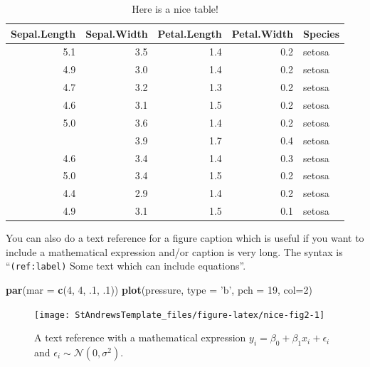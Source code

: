 \documentclass[
]{book}
\newenvironment{Shaded}{\begin{snugshade}}{\end{snugshade}}
\newcommand{\DataTypeTok}[1]{\textcolor[rgb]{0.13,0.29,0.53}{#1}}
\newcommand{\DecValTok}[1]{\textcolor[rgb]{0.00,0.00,0.81}{#1}}
\newcommand{\FloatTok}[1]{\textcolor[rgb]{0.00,0.00,0.81}{#1}}
\newcommand{\KeywordTok}[1]{\textcolor[rgb]{0.13,0.29,0.53}{\textbf{#1}}}
\newcommand{\NormalTok}[1]{#1}
\newcommand{\StringTok}[1]{\textcolor[rgb]{0.31,0.60,0.02}{#1}}
\theoremstyle{definition}
\theoremstyle{definition}
\theoremstyle{definition}
\theoremstyle{remark}
\begin{document}
\begin{table}

\caption{\label{tab:nice-tab}Here is a nice table!}
\centering
\begin{tabular}[t]{rrrrl}
\toprule
Sepal.Length & Sepal.Width & Petal.Length & Petal.Width & Species\\
\midrule
5.1 & 3.5 & 1.4 & 0.2 & setosa\\
4.9 & 3.0 & 1.4 & 0.2 & setosa\\
4.7 & 3.2 & 1.3 & 0.2 & setosa\\
4.6 & 3.1 & 1.5 & 0.2 & setosa\\
5.0 & 3.6 & 1.4 & 0.2 & setosa\\
\addlinespace
5.4 & 3.9 & 1.7 & 0.4 & setosa\\
4.6 & 3.4 & 1.4 & 0.3 & setosa\\
5.0 & 3.4 & 1.5 & 0.2 & setosa\\
4.4 & 2.9 & 1.4 & 0.2 & setosa\\
4.9 & 3.1 & 1.5 & 0.1 & setosa\\
\bottomrule
\end{tabular}
\end{table}

You can also do a text reference for a figure caption which is useful if you want to include a mathematical expression and/or caption is very long. The syntax is ``\texttt{(ref:label)} Some text which can include equations''.



\begin{Shaded}
\begin{Highlighting}[]
\KeywordTok{par}\NormalTok{(}\DataTypeTok{mar =} \KeywordTok{c}\NormalTok{(}\DecValTok{4}\NormalTok{, }\DecValTok{4}\NormalTok{, }\FloatTok{.1}\NormalTok{, }\FloatTok{.1}\NormalTok{))}
\KeywordTok{plot}\NormalTok{(pressure, }\DataTypeTok{type =} \StringTok{'b'}\NormalTok{, }\DataTypeTok{pch =} \DecValTok{19}\NormalTok{, }\DataTypeTok{col=}\DecValTok{2}\NormalTok{)}
\end{Highlighting}
\end{Shaded}

\begin{figure}

{\centering \texttt{[image: StAndrewsTemplate\_files/figure-latex/nice-fig2-1]} 

}

\caption{A text reference with a mathematical expression \(y_i=\beta_0 + \beta_1x_i + \epsilon_i\) and \(\epsilon_i \sim \mathcal{N}(0, \sigma^2)\).}\label{fig:nice-fig2}
\end{figure}
\end{document}
